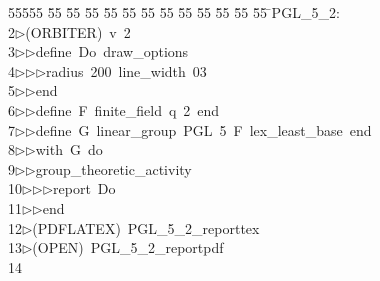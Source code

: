 %
%
\begin{tabbing}
55555 \= 55 \= 55 \= 55 \= 55 \= 55 \= 55 \= 55 \= 55 \= 55 \= 55 \= 55 \= 55 \= \>PGL\_5\_2:\\[0pt]
2\>$\triangleright$\>(ORBITER)\ v\ 2\ \\[0pt]
3\>$\triangleright$\>$\triangleright$\>define\ Do\ draw\_options\ \\[0pt]
4\>$\triangleright$\>$\triangleright$\>$\triangleright$\>radius\ 200\ line\_width\ 03\ \\[0pt]
5\>$\triangleright$\>$\triangleright$\>end\ \\[0pt]
6\>$\triangleright$\>$\triangleright$\>define\ F\ finite\_field\ q\ 2\ end\ \\[0pt]
7\>$\triangleright$\>$\triangleright$\>define\ G\ linear\_group\ PGL\ 5\ F\ lex\_least\_base\ end\ \\[0pt]
8\>$\triangleright$\>$\triangleright$\>with\ G\ do\ \\[0pt]
9\>$\triangleright$\>$\triangleright$\>group\_theoretic\_activity\ \\[0pt]
10\>$\triangleright$\>$\triangleright$\>$\triangleright$\>report\ Do\ \\[0pt]
11\>$\triangleright$\>$\triangleright$\>end\\[0pt]
12\>$\triangleright$\>(PDFLATEX)\ PGL\_5\_2\_reporttex\\[0pt]
13\>$\triangleright$\>(OPEN)\ PGL\_5\_2\_reportpdf\\[0pt]
14\>\end{tabbing}
